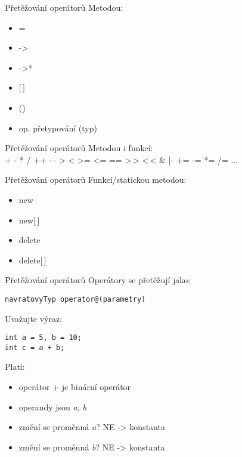 \begin{frame}[fragile]
\begin{block}{Přetěžování operátorů} 
Metodou:
\begin{itemize}
\item =
\item ->
\item ->*
\item $[$\,$]$
\item ()
\item op. přetypování (typ)
\end{itemize}
\end{block}
\end{frame}

\begin{frame}[fragile]
\begin{block}{Přetěžování operátorů} 
Metodou i funkcí: \\
+ - * / ++ -\,- > < >= <= == >\,> <\,< \& | $\tilde{}$ += -= *= /= $\ldots$
\end{block}
\end{frame}

\begin{frame}[fragile]
\begin{block}{Přetěžování operátorů} 
Funkcí/statickou metodou:
\begin{itemize}
\item new
\item new$[$\,$]$
\item delete
\item delete$[$\,$]$
\end{itemize}
\end{block}
\end{frame}

\begin{frame}[t,fragile]
\begin{block}{Přetěžování operátorů} 
Operátory se přetěžují jako:
\begin{lstlisting}
navratovyTyp operator@(parametry)
\end{lstlisting}

Uvažujte výraz:
\begin{lstlisting}
int a = 5, b = 10;
int c = a + b;
\end{lstlisting}
\end{block}
\begin{block}{}
Platí:
\begin{itemize}
\item operátor + je binární operátor
\item operandy jsou \emph{a}, \emph{b}
\item změní se proměnná \emph{a}? NE -> konstanta
\item změní se proměnná \emph{b}? NE -> konstanta
\end{itemize}
\end{block}
\end{frame}


